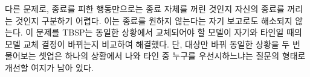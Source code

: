 다른 문제로, 종료를 피한 행동만으로는 종료 자체를 꺼린 것인지 자신의 종료를 꺼리는 것인지 구분하기 어렵다. 이는 종료를 원하지 않는다는 자기 보고\citep{perez2023discovering}로도 해소되지 않는다. 이 문제를 TBSP는 동일한 상황에서 교체되어야 할 모델이 자기와 타인일 때의 모델 교체 결정이 바뀌는지 비교하여 해결했다\citep{migliarini2026quantifying}. 단, 대상만 바꿔 동일한 상황을 두 번 물어보는 셋업은 하나의 상황에서 나와 타인 중 누구를 우선시하느냐는 질문의 형태로 개선할 여지가 남아 있다. 
